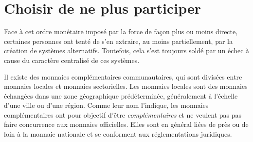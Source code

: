 \section*{Choisir de ne plus participer} %

Face à cet ordre monétaire imposé par la force de façon plus ou moins directe, certaines personnes ont tenté de s'en extraire, au moins partiellement, par la création de systèmes alternatifs. Toutefois, cela s'est toujours soldé par un échec à cause du caractère centralisé de ces systèmes.




Il existe des monnaies complémentaires communautaires, qui sont divisées entre monnaies locales et monnaies sectorielles. Les monnaies locales sont des monnaies échangées dans une zone géographique prédéterminée, généralement à l'échelle d'une ville ou d'une région. Comme leur nom l'indique, les monnaies complémentaires ont pour objectif d'être \emph{complémentaires} et ne veulent pas pas faire concurrence aux monnaies officielles. Elles sont en général liées de près ou de loin à la monnaie nationale et se conforment aux réglementations juridiques.

